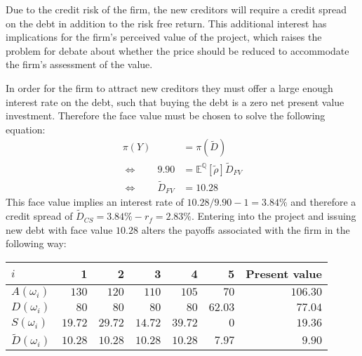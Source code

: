 \documentclass[../main.tex]{subfiles}
\begin{document}
        Due to the credit risk of the firm, the new creditors will require a credit spread on the debt in addition to the risk free return.
        This additional interest has implications for the firm's perceived value of the project, which raises the problem for debate about whether the price should be reduced to accommodate the firm's assessment of the value.

        In order for the firm to attract new creditors they must offer a large enough interest rate on the debt, such that buying the debt is a zero net present value investment.
        Therefore the face value must be chosen to solve the following equation:
            \begin{align}
                \pi(Y) &= \pi(\tilde{D}) \\
                \Leftrightarrow  \qquad
                9.90 &= \mathbb{E}^{\mathbb{Q}}\left[\tilde{\rho}\right] \tilde{D}_{FV} \\
                \Leftrightarrow  \qquad
                \tilde{D}_{FV} &= 10.28
            \end{align}
        This face value implies an interest rate of $10.28 / 9.90 - 1 = 3.84\%$ and therefore a credit spread of $\tilde{D}_{CS} = 3.84\% - r_{f} = 2.83\%$.
        Entering into the project and issuing new debt with face value $10.28$ alters the payoffs associated with the firm in the following way:
        \begin{table}[H]
            \centering
            \begin{tabular}{l|rrrrr||r}
                $i$ & 1 & 2 & 3 & 4 & 5 & Present value \\
                \hline
                $A(\omega_{i})$ & $130$ & $120$ & $110$ & $105$ & $70$ & $106.30$ \\
                $D(\omega_{i})$ & $80$ & $80$ & $80$ & $80$ & $62.03$ & $77.04$ \\
                $S(\omega_{i})$ & $19.72$ & $29.72$ & $14.72$ & $39.72$ & $0$ & $19.36$ \\
                $\tilde{D}(\omega_{i})$ & $10.28$ & $10.28$ & $10.28$ & $10.28$ & $7.97$ & $9.90$ \\
            \end{tabular}
        \end{table}
\end{document}
